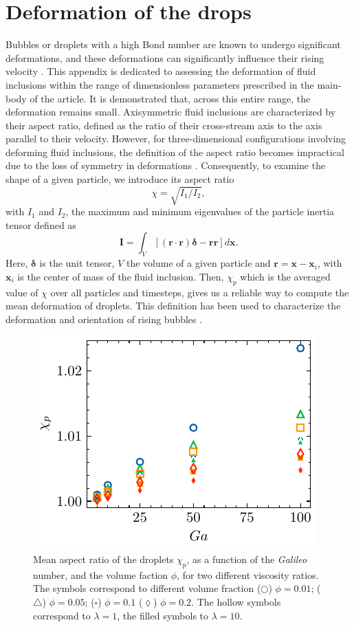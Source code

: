 \documentclass[11pt]{My_preprint}
\begin{document}
\appendix



\section{Deformation of the drops}
\label{ap:deformation} 

Bubbles or droplets with a high Bond number are known to undergo significant deformations, and these deformations can significantly influence their rising velocity \citep{bunner2003effect,tripathi2014}. 
This appendix is dedicated to assessing the deformation of fluid inclusions within the range of dimensionless parameters prescribed in the main-body of the article. 
It is demonstrated that, across this entire range, the deformation remains small. 
Axisymmetric fluid inclusions are characterized by their aspect ratio, defined as the ratio of their cross-stream axis to the axis parallel to their velocity. 
However, for three-dimensional configurations involving deforming fluid inclusions, the definition of the aspect ratio becomes impractical due to the loss of symmetry in deformations \citep{bunner2003effect}. 
Consequently, to examine the shape of a given particle, we introduce its aspect ratio  
\begin{equation}
    \chi =  \sqrt{I_1 /I_2},
\end{equation}
with $I_1$ and $I_2$, the maximum and minimum eigenvalues of the particle inertia tensor defined as
\begin{equation*}
    \textbf{I}
    = \int_{V} \left[
        (\textbf{r}\cdot \textbf{r}) \bm\delta  - \textbf{rr}
        \right]
    d\textbf{x}.
\end{equation*}
Here, $\bm\delta$ is the unit tensor, $V$ the volume of a given particle and $\textbf{r} = \textbf{x} - \textbf{x}_i$, with $\textbf{x}_i$ is the center of mass of the fluid inclusion. 
Then, $\chi_p$ which is the averaged value of $\chi$ over all particles and timesteps, gives us a reliable way to compute the mean deformation of droplets. 
This definition has been used to characterize the deformation and orientation of rising bubbles \citep{bunner2003effect}. 
\begin{figure}[h!]
    \centering
    \includegraphics[height = 0.3\textwidth]{image/HOMOGENEOUS_NEW/PA/chi.pdf}
    \caption{Mean aspect ratio of the droplets $\chi_p$, as a function of the \textit{Galileo} number, and the volume faction $\phi$,  for two different viscosity ratios.  
    The symbols correspond to different volume fraction ($\pmb\bigcirc$) $\phi = 0.01$; ($\pmb\triangle$) $ \phi = 0.05$; ($\pmb\square$) $\phi = 0.1$ ($\pmb\lozenge$) $\phi = 0.2$.
    The hollow symbols correspond to $\lambda = 1$, the filled symbols to $\lambda = 10$.
    }
    \label{fig:chi}
\end{figure}
\end{document}
